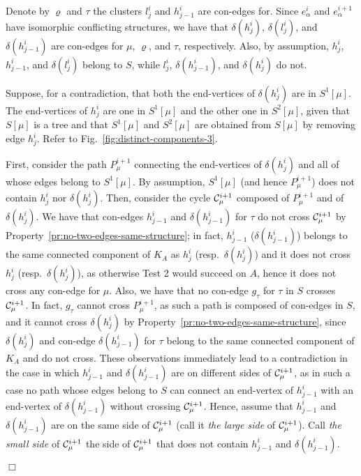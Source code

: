 \documentclass[letter,runningheads]{llncs}
\renewenvironment{proof}
{{\em Proof.\ }}{\hspace*{\fill}$\Box$\par\vspace{2mm}}
\begin{document}
\begin{proof}
\begin{itemize}
    Denote by $\varrho$ and $\tau$ the clusters $l^i_j$ and $h^i_{j-1}$ are con-edges for. Since $e^i_\alpha$ and $e^{i+1}_\alpha$ have isomorphic conflicting structures, we have that $\delta(h^i_j)$, $\delta(l^i_j)$, and $\delta(h^i_{j-1})$ are con-edges for $\mu$, $\varrho$, and $\tau$, respectively. Also, by assumption, $h^i_j$, $h^i_{j-1}$, and $\delta(l^i_{j})$ belong to $S$, while $l^i_j$, $\delta(h^i_{j-1})$, and $\delta(h^i_{j})$ do not.

    Suppose, for a contradiction, that both the end-vertices of $\delta(h^i_j)$ are in $S^1[\mu]$. The end-vertices of $h^i_j$ are one in $S^1[\mu]$ and the other one in $S^2[\mu]$, given that $S[\mu]$ is a tree and that $S^1[\mu]$ and $S^2[\mu]$ are obtained from $S[\mu]$ by removing edge $h^i_j$. Refer to Fig.~\ref{fig:distinct-components-3}.

    First, consider the path $P^{i+1}_{\mu}$ connecting the end-vertices of $\delta(h^i_j)$ and all of whose edges belong to $S^1[\mu]$. By assumption, $S^1[\mu]$ (and hence $P^{i+1}_{\mu}$) does not contain $h^i_j$ nor $\delta(h^i_{j})$. Then, consider the cycle ${\cal C}^{i+1}_{\mu}$ composed of $P^{i+1}_{\mu}$ and of $\delta(h^i_j)$. We have that con-edges $h^i_{j-1}$ and $\delta(h^i_{j-1})$ for $\tau$ do not cross ${\cal C}^{i+1}_{\mu}$ by Property~\ref{pr:no-two-edges-same-structure}; in fact, $h^i_{j-1}$ ($\delta(h^i_{j-1})$) belongs to the same connected component of $K_A$ as $h^i_{j}$ (resp.\  $\delta(h^i_{j})$) and it does not cross $h^i_{j}$ (resp.\ $\delta(h^i_{j})$), as otherwise {\sc Test 2} would succeed on $A$, hence it does not cross any con-edge for $\mu$. Also, we have that no con-edge $g_{\tau}$ for $\tau$ in $S$ crosses ${\cal C}^{i+1}_{\mu}$. In fact, $g_{\tau}$ cannot cross $P^{i+1}_{\mu}$, as such a path is composed of con-edges in $S$, and it cannot cross $\delta(h^i_{j})$ by Property~\ref{pr:no-two-edges-same-structure}, since $\delta(h^i_{j})$ and con-edge $\delta(h^i_{j-1})$ for $\tau$ belong to the same connected component of $K_A$ and do not cross. These observations immediately lead to a contradiction in the case in which $h^i_{j-1}$ and $\delta(h^i_{j-1})$ are on different sides of ${\cal C}^{i+1}_{\mu}$, as in such a case no path whose edges belong to $S$ can connect an end-vertex of $h^i_{j-1}$ with an end-vertex of $\delta(h^i_{j-1})$ without crossing ${\cal C}^{i+1}_{\mu}$. Hence, assume that $h^i_{j-1}$ and $\delta(h^i_{j-1})$ are on the same side of ${\cal C}^{i+1}_{\mu}$ (call it {\em the large side} of ${\cal C}^{i+1}_{\mu}$). Call {\em the small side} of ${\cal C}^{i+1}_{\mu}$ the side of ${\cal C}^{i+1}_{\mu}$ that does not contain $h^i_{j-1}$ and $\delta(h^i_{j-1})$.



\end{itemize}
\end{proof}
\end{document}
